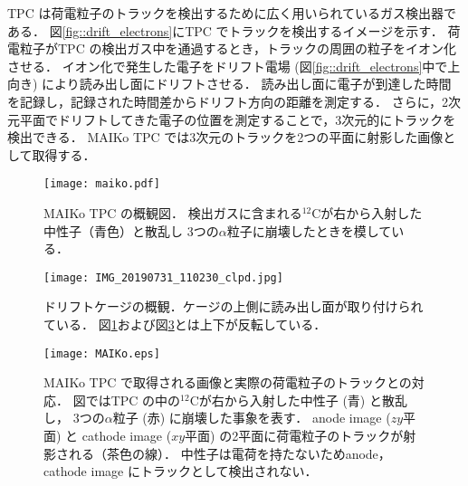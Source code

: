 \documentclass[../master]{subfiles}
\begin{document}
TPC は荷電粒子のトラックを検出するために広く用いられているガス検出器である．
図\ref{fig::drift_electrons}にTPC でトラックを検出するイメージを示す．
荷電粒子がTPC の検出ガス中を通過するとき，トラックの周囲の粒子をイオン化させる．
イオン化で発生した電子をドリフト電場 (図\ref{fig::drift_electrons}中で上向き) により読み出し面にドリフトさせる．
読み出し面に電子が到達した時間を記録し，記録された時間差からドリフト方向の距離を測定する．
さらに，2次元平面でドリフトしてきた電子の位置を測定することで，3次元的にトラックを検出できる．
MAIKo TPC では3次元のトラックを2つの平面に射影した画像として取得する．
%
\begin{figure}
  \centering
  \texttt{[image: maiko.pdf]}
  \caption{MAIKo TPC の概観図．
    検出ガスに含まれる${}^{12}\mathrm{C}$が右から入射した中性子（青色）と散乱し
    3つの$\alpha$粒子に崩壊したときを模している．}
  \label{fig::maiko_cage}
\end{figure}
\begin{figure}
  \centering
  \texttt{[image: IMG\_20190731\_110230\_clpd.jpg]}
  \caption[ドリフトケージの概観．]
          {ドリフトケージの概観．ケージの上側に読み出し面が取り付けられている．
          図\ref{fig::maiko_cage}および図\ref{fig::MAIKo_view}とは上下が反転している．}
  \label{pic::MAIKo_cage}
\end{figure}
\begin{figure}
  \centering
  \texttt{[image: MAIKo.eps]}
  \caption{MAIKo TPC で取得される画像と実際の荷電粒子のトラックとの対応．
    図ではTPC の中の${}^{12}\mathrm{C}$が右から入射した中性子 (青) と散乱し，
    3つの$\alpha$粒子 (赤) に崩壊した事象を表す．
    anode image ($zy$平面) と cathode image ($xy$平面) の2平面に荷電粒子のトラックが射影される（茶色の線）．
    中性子は電荷を持たないためanode，cathode image にトラックとして検出されない．
  }
  \label{fig::MAIKo_view}
\end{figure}
\end{document}
